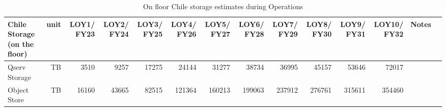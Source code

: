 \tiny \begin{longtable} { |p{}  |r  |r  |r  |r  |r  |r  |r  |r  |r  |r  |r  |r  |r |} 
\caption{On floor Chile storage estimates during Operations
 \label{tab:chileStorageOps}}\\ 
\hline 
\textbf{Chile Storage (on the floor)}&\textbf{unit}&\textbf{LOY1/ FY23}&\textbf{LOY2/ FY24}&\textbf{LOY3/ FY25}&\textbf{LOY4/ FY26}&\textbf{LOY5/ FY27}&\textbf{LOY6/ FY28}&\textbf{LOY7/ FY29}&\textbf{LOY8/ FY30}&\textbf{LOY9/ FY31}&\textbf{LOY10/ FY32}&\textbf{Notes} \\ \hline
{Qserv Storage}&{TB}&{3510}&{9257}&{17275}&{24144}&{31277}&{38734}&{36995}&{45157}&{53646}&{72017}& \\ \hline
{Object Store}&{TB}&{16160}&{43665}&{82515}&{121364}&{160213}&{199063}&{237912}&{276761}&{315611}&{354460}& \\ \hline
\end{longtable} \normalsize
